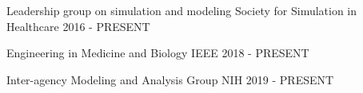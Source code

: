 
\begin{cventries}

  \cventry
    {Leadership group on simulation and modeling} %
    {Society for Simulation in Healthcare} %
    {} %
    {2016 - PRESENT} %
    {
    }

      \cventry
    {Engineering in Medicine and Biology} %
    {IEEE} %
    {} %
    {2018 - PRESENT} %
    {
    }

      \cventry
    {Inter-agency Modeling and Analysis Group } %
    {NIH } %
    {} %
    {2019 - PRESENT} %
    {
    }

\end{cventries}
